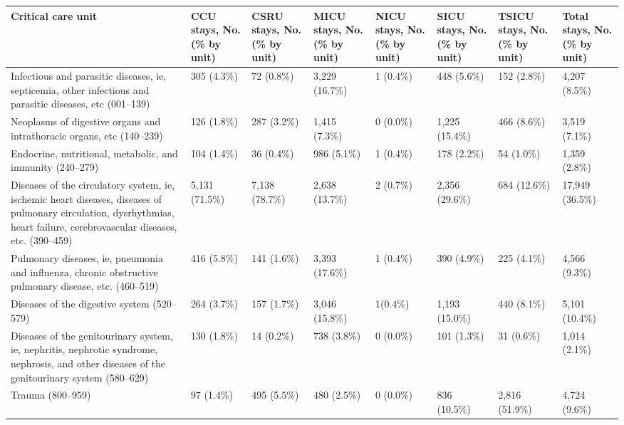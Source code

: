 \documentclass[english]{article}
\begin{document}

\begin{center}
\begin{table}
\begin{tabular}{|p{3.8cm}|p{1.2cm}|p{1.2cm}|p{1.2cm}|p{1.2cm}|p{1.2cm}|p{1.2cm}|p{1.2cm}|}
    \hline
    Critical care unit & 
    CCU stays, No. (\% by unit) & 
    CSRU stays, No. (\% by unit) &    
    MICU stays, No. (\% by unit) & 
    NICU stays, No. (\% by unit) & 
    SICU stays, No. (\% by unit) & 
    TSICU stays, No. (\% by unit) & 
    Total stays, No. (\% by unit) \\ 
    \hline
    Infectious and parasitic diseases, ie, septicemia, other infectious and parasitic diseases, etc (001–139)
    & 305 (4.3\%) & 72 (0.8\%) & 3,229 (16.7\%) & 1 (0.4\%) & 448 (5.6\%) & 152 (2.8\%) & 4,207 (8.5\%) \\ 
    \hline
    Neoplasms of digestive organs and intrathoracic organs, etc (140–239)
    & 126 (1.8\%) & 287 (3.2\%) & 1,415 (7.3\%) & 0 (0.0\%) & 1,225 (15.4\%) & 466 (8.6\%) & 3,519 (7.1\%) \\ 
    \hline
    Endocrine, nutritional, metabolic, and immunity (240–279) 
    & 104 (1.4\%) & 36 (0.4\%) & 986 (5.1\%) & 1 (0.4\%) & 178 (2.2\%) & 54 (1.0\%) & 1,359 (2.8\%) \\ 
    \hline
    Diseases of the circulatory system, ie, ischemic heart diseases, diseases of pulmonary circulation, dysrhythmias, heart failure, cerebrovascular diseases, etc. (390–459) 
    & 5,131 (71.5\%) & 7,138 (78.7\%) & 2,638 (13.7\%) & 2 (0.7\%) & 2,356 (29.6\%) & 684 (12.6\%) & 17,949 (36.5\%) \\ 
    \hline
    Pulmonary diseases, ie, pneumonia and influenza, chronic obstructive pulmonary disease, etc. (460–519) 
    & 416 (5.8\%) & 141 (1.6\%) & 3,393 (17.6\%) & 1 (0.4\%) & 390 (4.9\%) & 225 (4.1\%) & 4,566 (9.3\%) \\ 
    \hline
    Diseases of the digestive system (520–579) 
    & 264 (3.7\%) & 157 (1.7\%) & 3,046 (15.8\%) & 1(0.4\%) & 1,193 (15.0\%) & 440 (8.1\%) & 5,101 (10.4\%) \\ 
    \hline
    Diseases of the genitourinary system, ie, nephritis, nephrotic syndrome, nephrosis, and other diseases of the genitourinary system (580–629) 
    & 130 (1.8\%) & 14 (0.2\%) & 738 (3.8\%) & 0 (0.0\%) & 101 (1.3\%) & 31 (0.6\%) & 1,014 (2.1\%) \\ 
    \hline
    Trauma (800–959) 
    & 97 (1.4\%) & 495 (5.5\%) & 480 (2.5\%) & 0 (0.0\%) & 836 (10.5\%) & 2,816 (51.9\%) & 4,724 (9.6\%) \\ 

\end{tabular}
\end{table}
\end{center}
\end{document}
